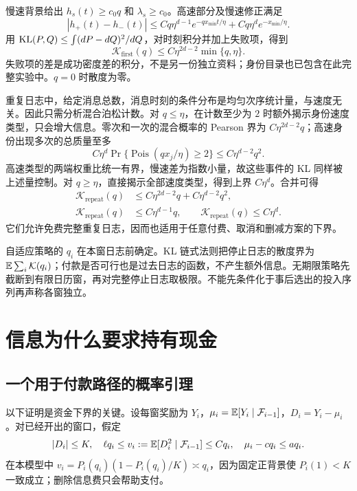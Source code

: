 慢速背景给出 $h_s(t)\geq c_0q$ 和 $\lambda_s\geq c_0$。高速部分及慢速修正满足
\[
 |h_+(t)-h_-(t)|\leq Cq\eta^{d-1}e^{-qx_{\min}t/\eta}
                  +Cq\eta^d e^{-x_{\min}/\eta}.
\]
用 $\operatorname{KL}(P,Q)\leq\int(dP-dQ)^2/dQ$，对时刻积分并加上失败项，得到
\begin{equation}\label{eq:firstKL}
 \mathcal K_{\mathrm{first}}(q)
 \leq C\eta^{2d-2}\min\{q,\eta\}.
\end{equation}
失败项的差是成功密度差的积分，不是另一份独立资料；身份目录也已包含在此完整实验中。$q=0$ 时散度为零。

重复日志中，给定消息总数，消息时刻的条件分布是均匀次序统计量，与速度无关。因此只需分析混合泊松计数。对 $q\leq\eta$，在计数至少为 $2$ 时额外揭示身份速度类型，只会增大信息。零次和一次的混合概率的 Pearson 界为 $C\eta^{2d-2}q$；高速身份出现多次的总质量至多
\[
 C\eta^d\Pr\{\operatorname{Pois}(qx_j/\eta)\geq2\}
 \leq C\eta^{d-2}q^2.
\]
高速类型的两端权重比统一有界，慢速差为指数小量，故这些事件的 KL 同样被上述量控制。对 $q\geq\eta$，直接揭示全部速度类型，得到上界 $C\eta^d$。合并可得
\begin{align}
 \mathcal K_{\mathrm{repeat}}(q)&\leq C\eta^{2d-2}q+C\eta^{d-2}q^2,\label{eq:repKLquad}\\
 \mathcal K_{\mathrm{repeat}}(q)&\leq C\eta^{d-1}q,
 \qquad \mathcal K_{\mathrm{repeat}}(q)\leq C\eta^d.\label{eq:repKLlinear}
\end{align}
它们允许免费完整重复日志，因而也适用于任意付费、取消和删减方案的下界。

自适应策略的 $q_i$ 在本窗日志前确定。KL 链式法则把停止日志的散度界为 $\mathbb E\sum_i\mathcal K(q_i)$；付款是否可行也是过去日志的函数，不产生额外信息。无期限策略先截断到有限日历窗，再对完整停止日志取极限。不能先条件化于事后选出的投入序列再声称各窗独立。

\section{信息为什么要求持有现金}
\subsection{一个用于付款路径的概率引理}
以下证明是资金下界的关键。设每窗奖励为 $Y_i$，$\mu_i=\mathbb E[Y_i\mid\mathcal F_{i-1}]$，$D_i=Y_i-\mu_i$。对已经开出的窗口，假定
\[
 |D_i|\leq K,\quad \ell q_i\leq v_i:=\mathbb E[D_i^2\mid\mathcal F_{i-1}]\leq Cq_i,
 \quad \mu_i-cq_i\leq aq_i.
\]
在本模型中 $v_i=P_i(q_i)(1-P_i(q_i)/K)\asymp q_i$，因为固定正背景使 $P_i(1)<K$ 一致成立；删除信息费只会帮助支付。

